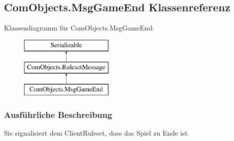 \hypertarget{a00059}{\subsection{Com\-Objects.\-Msg\-Game\-End Klassenreferenz}
\label{a00059}
}
Klassendiagramm für Com\-Objects.\-Msg\-Game\-End\-:\begin{figure}[H]
\begin{center}
\leavevmode
\includegraphics[height=3.000000cm]{a00059}
\end{center}
\end{figure}


\subsubsection{Ausführliche Beschreibung}
Sie signalisiert dem Client\-Ruleset, dass das Spiel zu Ende ist. 